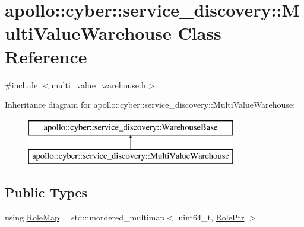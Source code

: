 \hypertarget{classapollo_1_1cyber_1_1service__discovery_1_1MultiValueWarehouse}{\section{apollo\-:\-:cyber\-:\-:service\-\_\-discovery\-:\-:Multi\-Value\-Warehouse Class Reference}
\label{classapollo_1_1cyber_1_1service__discovery_1_1MultiValueWarehouse}
}


{\ttfamily \#include $<$multi\-\_\-value\-\_\-warehouse.\-h$>$}

Inheritance diagram for apollo\-:\-:cyber\-:\-:service\-\_\-discovery\-:\-:Multi\-Value\-Warehouse\-:\begin{figure}[H]
\begin{center}
\leavevmode
\includegraphics[height=2.000000cm]{classapollo_1_1cyber_1_1service__discovery_1_1MultiValueWarehouse}
\end{center}
\end{figure}
\subsection*{Public Types}
\begin{DoxyCompactItemize}
\item 
using \hyperlink{classapollo_1_1cyber_1_1service__discovery_1_1MultiValueWarehouse_ac7825b1126cd0ce4193fb1c6de2e1159}{Role\-Map} = std\-::unordered\-\_\-multimap$<$ uint64\-\_\-t, \hyperlink{namespaceapollo_1_1cyber_1_1service__discovery_a47c65bbb4b41d9ae41bfbd33271df525}{Role\-Ptr} $>$
\end{DoxyCompactItemize}
